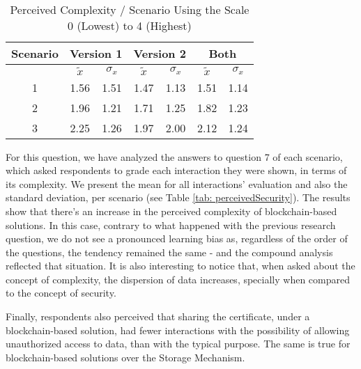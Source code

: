 \begin{table}[htb]
	\centering
	\caption{Perceived Complexity / Scenario Using the Scale 0 (Lowest) to 4 (Highest)}
	\label{tab: perceivedComplexity}
	\begin{tabular}{c|cccc|cc}
		\hline
		Scenario & \multicolumn{2}{c}{\bf Version 1} & \multicolumn{2}{c}{\bf Version 2} \vrule & \multicolumn{2}{c}{\bf Both}                                             \\
		\hline
		         & $\tilde{x}$                       & $\sigma_{x}$                             & $\tilde{x}$                  & $\sigma_{x}$ & $\tilde{x}$ & $\sigma_{x}$ \\
		\hline
		1        & 1.56                              & 1.51                                     & 1.47                         & 1.13         & 1.51        & 1.14         \\
		2        & 1.96                              & 1.21                                     & 1.71                         & 1.25         & 1.82        & 1.23         \\
		3        & 2.25                              & 1.26                                     & 1.97                         & 2.00         & 2.12        & 1.24         \\
		\hline
	\end{tabular}
\end{table}

For this question, we have analyzed the answers to question 7 of each scenario, which asked respondents to grade each interaction they were shown, in terms of its complexity. We present the mean for all interactions' evaluation and also the standard deviation, per scenario (see Table \ref{tab: perceivedSecurity}). The results show that there's an increase in the perceived complexity of blockchain-based solutions. In this case, contrary to what happened with the previous research question, we do not see a pronounced learning bias as, regardless of the order of the questions, the tendency remained the same - and the compound analysis reflected that situation. It is also interesting to notice that, when asked about the concept of complexity, the dispersion of data increases, specially when compared to the concept of security.

Finally, respondents also perceived that sharing the certificate, under a blockchain-based solution, had fewer interactions with the possibility of allowing unauthorized access to data, than with the typical purpose. The same is true for blockchain-based solutions over the Storage Mechanism.

